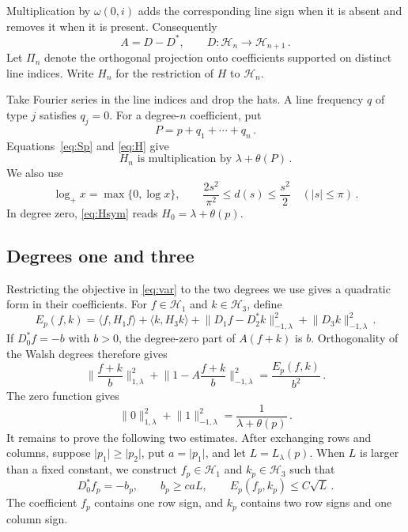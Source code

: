 \documentclass[11pt]{amsart}
\theoremstyle{plain}
\theoremstyle{definition}
\newcommand{\1}{\mathbf 1}
\newcommand{\ip}[2]{\langle #1,#2\rangle}
\newcommand{\norm}[1]{\lVert #1\rVert}
\newcommand{\abs}[1]{\lvert #1\rvert}
\newcommand{\Hs}{\mathcal H}
\newcommand{\Hminus}[1]{\norm{#1}_{-1,\lambda}}
\newcommand{\Hplus}[1]{\norm{#1}_{1,\lambda}}
\begin{document}
Multiplication by $\omega(0,i)$ adds the corresponding line sign when it is
absent and removes it when it is present.  Consequently
\begin{equation}\label{eq:DA}
  A=D-D^*,\qquad D\colon\Hs_n\longrightarrow\Hs_{n+1}\, .
\end{equation}
Let $\Pi_n$ denote the orthogonal projection onto coefficients supported on
distinct line indices.
Write $H_n$ for the restriction of $H$ to $\Hs_n$.

Take Fourier series in the line indices and drop the hats.  A line frequency
$q$ of type $j$ satisfies $q_j=0$.  For a degree-$n$ coefficient, put
\begin{equation}\label{eq:P}
  P=p+q_1+\cdots+q_n\, .
\end{equation}
Equations~\eqref{eq:Sp} and \eqref{eq:H} give
\begin{equation}\label{eq:Hsym}
  \text{$H_n$ is multiplication by }\lambda+\theta(P)\, .
\end{equation}
We also use
\begin{equation}\label{eq:sine}
  \log_+x=\max\{0,\log x\},
  \qquad \frac{2s^2}{\pi^2}\leq d(s)\leq\frac{s^2}{2}
  \quad (\abs s\leq\pi)\, .
\end{equation}
In degree zero, \eqref{eq:Hsym} reads $H_0=\lambda+\theta(p)$.

\subsection{Degrees one and three}\label{ssec:degrees-one-three}

Restricting the objective in \eqref{eq:var} to the two degrees we use gives a
quadratic form in their coefficients.  For $f\in\Hs_1$ and $k\in\Hs_3$,
define
\begin{equation}\label{eq:E}
  E_p(f,k)=\ip f{H_1f}+\ip k{H_3k}
  +\Hminus{D_1f-D_2^*k}^2+\Hminus{D_3k}^2\, .
\end{equation}
If $D_0^*f=-b$ with $b>0$, the degree-zero part of
$A(f+k)$ is $b$.  Orthogonality of the Walsh degrees therefore gives
\begin{equation}\label{eq:exact-cancellation}
  \Hplus{\frac{f+k}{b}}^2+
  \Hminus{1-A\frac{f+k}{b}}^2
  =\frac{E_p(f,k)}{b^2}\, .
\end{equation}
The zero function gives
\begin{equation}\label{eq:zero-function}
  \Hplus0^2+\Hminus1^2=\frac1{\lambda+\theta(p)}\, .
\end{equation}
It remains to prove the following two estimates.  After exchanging rows and
columns, suppose
$\abs{p_1}\geq\abs{p_2}$, put $a=\abs{p_1}$, and let
$L=L_\lambda(p)$.  When $L$ is larger than a fixed constant, we construct
$f_p\in\Hs_1$ and $k_p\in\Hs_3$ such that
\begin{equation}\label{eq:construction}
  D_0^*f_p=-b_p,\qquad b_p\geq caL,\qquad
  E_p(f_p,k_p)\leq C\sqrt L\, .
\end{equation}
The coefficient $f_p$ contains one row sign, and $k_p$ contains two row
signs and one column sign.
\end{document}

